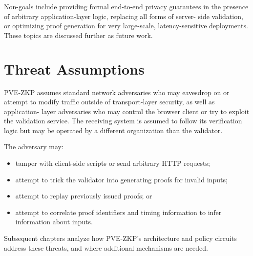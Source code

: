 Non-goals include providing formal end-to-end privacy guarantees in the
presence of arbitrary application-layer logic, replacing all forms of server-
side validation, or optimizing proof generation for very large-scale,
latency-sensitive deployments. These topics are discussed further as future
work.

\section{Threat Assumptions}

PVE-ZKP assumes standard network adversaries who may eavesdrop on or attempt to
modify traffic outside of transport-layer security, as well as application-
layer adversaries who may control the browser client or try to exploit the
validation service. The receiving system is assumed to follow its verification
logic but may be operated by a different organization than the validator.

The adversary may:

\begin{itemize}[leftmargin=*]
  \item tamper with client-side scripts or send arbitrary HTTP requests;
  \item attempt to trick the validator into generating proofs for invalid
        inputs;
  \item attempt to replay previously issued proofs; or
  \item attempt to correlate proof identifiers and timing information to infer
        information about inputs.
\end{itemize}

Subsequent chapters analyze how PVE-ZKP's architecture and policy circuits
address these threats, and where additional mechanisms are needed.
